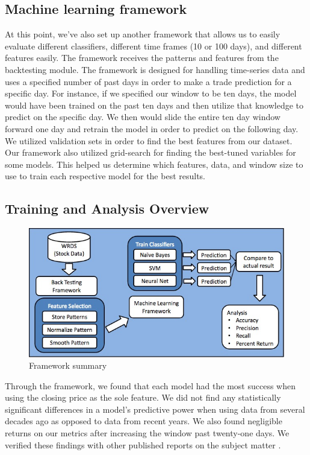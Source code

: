 \documentclass{article}
\begin{document}
\subsection{Machine learning framework}
At this point, we've also set up another framework that allows us to easily evaluate different classifiers, different time frames (10 or 100 days), and different features easily. The framework receives the patterns and features from the backtesting module. The framework is designed for handling time-series data and uses a specified number of past days in order to make a trade prediction for a specific day. For instance, if we specified our window to be ten days, the model would have been trained on the past ten days and then utilize that knowledge to predict on the specific day. We then would slide the entire ten day window forward one day and retrain the model in order to predict on the following day. We utilized validation sets in order to find the best features from our dataset. Our framework also utilized grid-search for finding the best-tuned variables for some models. This helped us determine which features, data, and window size to use to train each respective model for the best results.

\subsection{Training and Analysis Overview}
\begin{figure}[h!]
\begin{center}
        \includegraphics[scale=0.37]{summary_fig}
        \caption{Framework summary}
\end{center}
\end{figure}

Through the framework, we found that each model had the most success when using the closing price as the sole feature. We did not find any statistically significant differences in a model's predictive power when using data from several decades ago as opposed to data from recent years. We also found negligible returns on our metrics after increasing the window past twenty-one days. We verified these findings with other published reports on the subject matter \cite{lin}.
\end{document}
